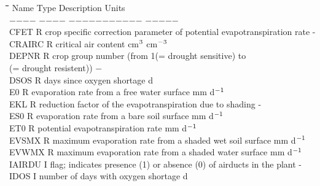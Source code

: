 \documentclass[11pt]{article}
\begin{document}
\begin{tabbing}
\hspace{1.27cm}\=\hspace{1.27cm}\=\hspace{1.27cm}\=\hspace{1.27cm}\=%
\hspace{1.27cm}\=\hspace{1.27cm}\=\hspace{1.27cm}\=\hspace{1.27cm}\=%
\hspace{1.27cm}\=\hspace{1.27cm}\=\kill
Name    \> \> Type   \> Description                                        \> \> \> \> \> \> \> Units\\
$-$$-$$-$$-$    \> \> $-$$-$$-$$-$   \> $-$$-$$-$$-$$-$$-$$-$$-$$-$$-$$-$                                        \> \> \> \> \> \> \> $-$$-$$-$$-$$-$\\
CFET\> \> R\> crop specific correction parameter of potential evapotranspiration rate\> \> \> \> \> \> \> -\\
CRAIRC\> \> R\> critical air content\> \> \> \> \> \> \> cm$^{{\rm 3}}$ cm$^{{\rm -3}}$\\
DEPNR\> \> R   \> crop group number (from 1(= drought sensitive) to \\
\>\> (= drought resistent))   \> \> \> \> \> \> \> $-$\\
DSOS\> \> R\> days since oxygen shortage\> \> \> \> \> \> \> d\\
E0\> \> R\> evaporation rate from a free water surface\> \> \> \> \> \> \> mm d$^{{\rm -1}}$\\
EKL\> \> R\> reduction factor of the evapotranspiration due to shading\> \> \> \> \> \> \> -\\
ES0\> \> R\> evaporation rate from a bare soil surface\> \> \> \> \> \> \> mm d$^{{\rm -1}}$\\
ET0\> \> R\> potential evapotranspiration rate\> \> \> \> \> \> \> mm d$^{{\rm -1}}$\\
EVSMX\> \> R\> maximum evaporation rate from a shaded wet soil surface\> \> \> \> \> \> \> mm d$^{{\rm -1}}$\\
EVWMX\> \> R\> maximum evaporation rate from a shaded water surface\> \> \> \> \> \> \> mm d$^{{\rm -1}}$\\
IAIRDU\> \> I\> flag; indicates presence (1) or absence (0) of airducts in the plant \> \> \> \> \> \> \> -\\
IDOS\> \> I\> number of days with oxygen shortage\> \> \> \> \> \> \> d\\

\end{tabbing}
\end{document}
